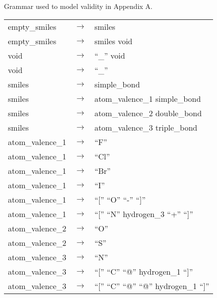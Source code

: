 

\label{annex:grammar-validity}

Grammar used to model \smiles validity in Appendix A\@.


\footnotesize
\begin{longtable}{m{} p{} p{}}
    empty\_smiles & $\rightarrow$ & smiles \\
    empty\_smiles & $\rightarrow$ & smiles void \\
    void & $\rightarrow$ & ``\_'' void \\
    void & $\rightarrow$ & ``\_'' \\
    smiles & $\rightarrow$ & simple\_bond \\
    smiles & $\rightarrow$ & atom\_valence\_1 simple\_bond \\
    smiles & $\rightarrow$ & atom\_valence\_2 double\_bond \\
    smiles & $\rightarrow$ & atom\_valence\_3 triple\_bond \\
    atom\_valence\_1 & $\rightarrow$ & ``F'' \\
    atom\_valence\_1 & $\rightarrow$ & ``Cl'' \\
    atom\_valence\_1 & $\rightarrow$ & ``Br'' \\
    atom\_valence\_1 & $\rightarrow$ & ``I'' \\
    atom\_valence\_1 & $\rightarrow$ & ``['' ``O'' ``-'' ``]'' \\
    atom\_valence\_1 & $\rightarrow$ & ``['' ``N'' hydrogen\_3 ``+'' ``]'' \\
    atom\_valence\_2 & $\rightarrow$ & ``O'' \\
    atom\_valence\_2 & $\rightarrow$ & ``S'' \\
    atom\_valence\_3 & $\rightarrow$ & ``N'' \\
    atom\_valence\_3 & $\rightarrow$ & ``['' ``C'' ``@'' hydrogen\_1 ``]'' \\
    atom\_valence\_3 & $\rightarrow$ & ``['' ``C'' ``@'' ``@'' hydrogen\_1 ``]'' \\

\end{longtable}
